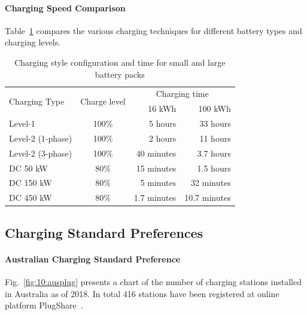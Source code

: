 \paragraph{Charging Speed Comparison}
Table~\ref{tbl:10:techniques} compares the various charging techniques for different battery types and charging levels.
\begin{table}[H]
	\centering
	\caption{Charging style configuration and time for small and large battery packs}
	\label{tbl:10:techniques}
	\begin{tabular}{lcrr}
		\toprule
		\multirow{2}{*}{Charging Type} & \multirow{2}{*}{Charge level} & \multicolumn{2}{c}{Charging time} \\
		\cmidrule(l){3-4}              &                               &   16 kWh    &       100 kWh       \\ \midrule
		Level-1                        &             100\%             &   5 hours   &      33 hours       \\
		Level-2 (1-phase)              &             100\%             &   2 hours   &      11 hours       \\
		Level-2 (3-phase)              &             100\%             & 40 minutes  &      3.7 hours      \\
		DC   50 kW                      &             80\%              & 15 minutes  &      1.5 hours      \\
		DC 150 kW                       &             80\%              &  5 minutes  &     32 minutes      \\
		DC 450 kW                       &             80\%              & 1.7 minutes &    10.7 minutes     \\ \bottomrule
	\end{tabular}
\end{table}

\subsection{Charging Standard Preferences}
\paragraph{Australian Charging Standard Preference}
Fig.~\ref{fig:10:ausplug} presents a chart of the number of charging stations installed in Australia as of 2018. In total 416 stations have been registered at online platform PlugShare~\cite{plugshare_plugshare_nodate}.

